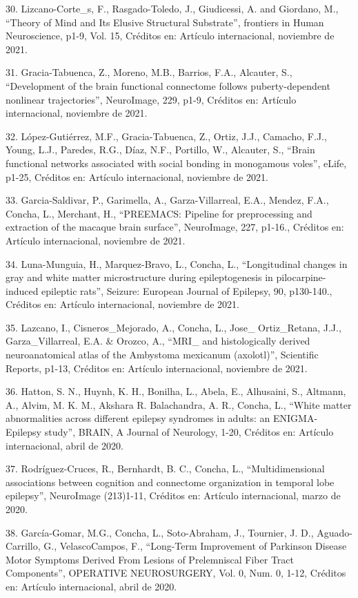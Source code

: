 30. Lizcano-Corte_s, F., Rasgado-Toledo, J., Giudicessi, A. and Giordano, M., “Theory of Mind and Its Elusive Structural 
Substrate”, frontiers in Human Neuroscience, p1-9, Vol. 15, Créditos en: Artículo internacional, noviembre de 2021.

31. Gracia-Tabuenca, Z., Moreno, M.B., Barrios, F.A., Alcauter, S., “Development of the brain functional connectome follows 
puberty-dependent nonlinear trajectories”, NeuroImage, 229, p1-9, Créditos en: Artículo internacional, noviembre de 2021.

32. López-Gutiérrez, M.F., Gracia-Tabuenca, Z., Ortiz, J.J., Camacho, F.J., Young, L.J., Paredes, R.G., Díaz, N.F., Portillo, 
W., Alcauter, S., “Brain functional networks associated with social bonding in monogamous voles”, eLife, p1-25, Créditos en: 
Artículo internacional, noviembre de 2021.

33. Garcia-Saldivar, P., Garimella, A., Garza-Villarreal, E.A., Mendez, F.A., Concha, L., Merchant, H., “PREEMACS: Pipeline for 
preprocessing and extraction of the macaque brain surface”, NeuroImage, 227, p1-16., Créditos en: Artículo internacional, 
noviembre de 2021.

34. Luna-Munguia, H., Marquez-Bravo, L., Concha, L., “Longitudinal changes in gray and white matter microstructure during 
epileptogenesis in pilocarpine-induced epileptic rats”, Seizure: European Journal of Epilepsy, 90, p130-140., Créditos en: 
Artículo internacional, noviembre de 2021.

35. Lazcano, I., Cisneros_Mejorado, A., Concha, L., Jose_ Ortiz_Retana, J.J., Garza_Villarreal, E.A. & Orozco, A., “MRI_ and 
histologically derived neuroanatomical atlas of the Ambystoma mexicanum (axolotl)”, Scientific Reports, p1-13, Créditos en: 
Artículo internacional, noviembre de 2021.

36. Hatton, S. N., Huynh, K. H., Bonilha, L., Abela, E., Alhusaini, S., Altmann, A., Alvim, M. K. M., Akshara R. Balachandra, 
A. R., Concha, L., “White matter abnormalities across different epilepsy syndromes in adults: an ENIGMA-Epilepsy study”, BRAIN, 
A Journal of Neurology, 1-20, Créditos en: Artículo internacional, abril de 2020.

37. Rodríguez-Cruces, R., Bernhardt, B. C., Concha, L., “Multidimensional associations between cognition and connectome 
organization in temporal lobe epilepsy”, NeuroImage (213)1-11, Créditos en: Artículo internacional, marzo de 2020.

38. García-Gomar, M.G., Concha, L., Soto-Abraham, J., Tournier, J. D., Aguado-Carrillo, G., VelascoCampos, F., “Long-Term 
Improvement of Parkinson Disease Motor Symptoms Derived From Lesions of Prelemniscal Fiber Tract Components”, OPERATIVE 
NEUROSURGERY, Vol. 0, Num. 0, 1-12, Créditos en: Artículo internacional, abril de 2020.

